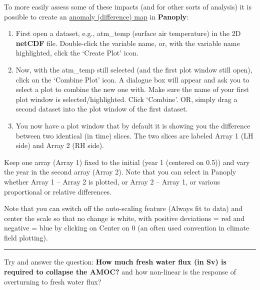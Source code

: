 \noindent To more easily assess some of these impacts (and for other sorts of analysis) it is possible to create an \uline{anomaly (difference) map} in \textbf{Panoply}:

\vspace{1mm}
\begin{enumerate}[noitemsep]
\vspace{1mm}
\item  First open a dataset, e.g., \textsf{\footnotesize atm\_temp} (surface air temperature) in the 2D \textbf{netCDF} file. Double-click the variable name, or, with the variable name highlighted, click the ‘Create Plot’ icon.
\vspace{-3mm}
\item Now, with the \textsf{\footnotesize atm\_temp} still selected (and the first plot window still open), click on the ‘Combine Plot’ icon. A dialogue box will appear and ask you to select a plot to combine the new one with. Make sure the name of your first plot window is selected/highlighted. Click ‘Combine’. OR, simply drag a second dataset into the plot window of the first dataset.
\vspace{1mm}
\item You now have a plot window that by default it is showing you the difference between two identical (in time) slices. The two slices are labeled Array 1 (LH side) and Array 2 (RH side).
\end{enumerate}
\vspace{1mm}

Keep one array (Array 1) fixed to the initial (year 1 (centered on 0.5)) and vary the year in the second array (Array 2). Note that you can select in Panoply whether Array 1 – Array 2 is plotted, or Array 2 – Array 1, or various proportional or relative differences.

Note that you can switch off the auto-scaling feature (Always fit to data) and center the scale so that no change is white, with positive deviations = red and negative = blue by clicking on Center on 0 (an often used convention in climate field plotting).

\vspace{1mm}\noindent\rule{4cm}{0.5pt}\vspace{2mm}

\noindent Try and answer the question: \textbf{How much fresh water flux (in Sv) is required to collapse the AMOC?} and how non-linear is the response of overturning to fresh water flux?

